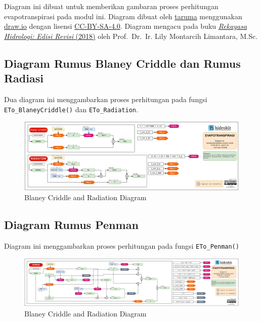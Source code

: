 \documentclass[11pt]{article}
\begin{document}
Diagram ini dibuat untuk memberikan gambaran proses perhitungan
evapotranspirasi pada modul ini. Diagram dibuat oleh
\href{https://taruma.github.io}{taruma} menggunakan
\href{https://www.draw.io/}{draw.io} dengan lisensi
\href{https://creativecommons.org/licenses/by-sa/4.0/}{CC-BY-SA-4.0}.
Diagram mengacu pada buku
\href{https://www.gramedia.com/products/rekayasa-hidrologi-edisi-revisi}{\emph{Rekayasa
Hidrologi: Edisi Revisi} (2018)} oleh Prof.~Dr.~Ir. Lily Montarcih
Limantara, M.Sc.

\hypertarget{diagram-rumus-blaney-criddle-dan-rumus-radiasi}{%
\subsection{Diagram Rumus Blaney Criddle dan Rumus
Radiasi}\label{diagram-rumus-blaney-criddle-dan-rumus-radiasi}}

Dua diagram ini menggambarkan proses perhitungan pada fungsi
\texttt{ETo\_BlaneyCriddle()} dan \texttt{ETo\_Radiation}.

\begin{figure}
\centering
\includegraphics{ETo_1_hidrokit_1_0_0.jpg}
\caption{Blaney Criddle and Radiation Diagram}
\end{figure}

\hypertarget{diagram-rumus-penman}{%
\subsection{Diagram Rumus Penman}\label{diagram-rumus-penman}}

Diagram ini menggambarkan proses perhitungan pada fungsi
\texttt{ETo\_Penman()}

\begin{figure}
\centering
\includegraphics{ETo_2_hidrokit_1_0_0.jpg}
\caption{Blaney Criddle and Radiation Diagram}
\end{figure}
\end{document}
